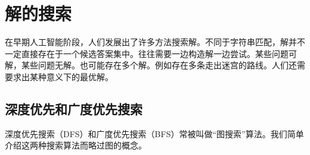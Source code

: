 \documentclass[b5paper]{ctexart}
\begin{document}





\section{解的搜索}

在早期人工智能阶段，人们发展出了许多方法搜索解。不同于字符串匹配，解并不一定直接存在于一个候选答案集中。往往需要一边构造解一边尝试。某些问题可解，某些问题无解。也可能存在多个解。例如存在多条走出迷宫的路线。人们还需要求出某种意义下的最优解。

\subsection{深度优先和广度优先搜索}
 
深度优先搜索（DFS）和广度优先搜索（BFS）常被叫做“图搜索”算法。我们简单介绍这两种搜索算法而略过图的概念。
\end{document}
